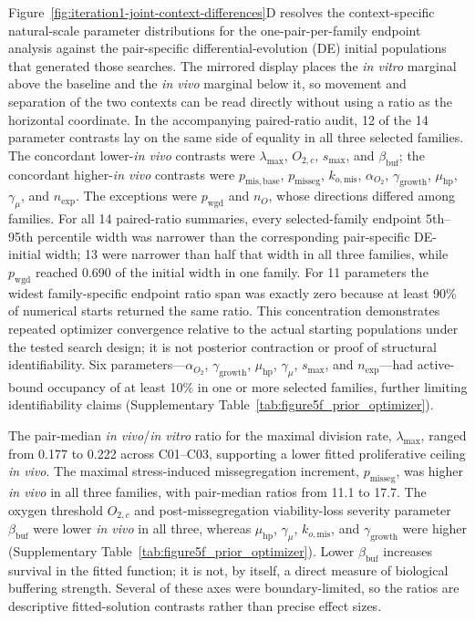 \documentclass[11pt]{article}
\begin{document}
Figure~\ref{fig:iteration1-joint-context-differences}D resolves the context-specific natural-scale parameter distributions for the one-pair-per-family endpoint analysis against the pair-specific differential-evolution (DE) initial populations that generated those searches. The mirrored display places the \textit{in vitro} marginal above the baseline and the \textit{in vivo} marginal below it, so movement and separation of the two contexts can be read directly without using a ratio as the horizontal coordinate. In the accompanying paired-ratio audit, 12 of the 14 parameter contrasts lay on the same side of equality in all three selected families. The concordant lower-\textit{in vivo} contrasts were $\lambda_{\max}$, $O_{2,c}$, $s_{\max}$, and $\beta_{\mathrm{buf}}$; the concordant higher-\textit{in vivo} contrasts were $p_{\mathrm{mis,base}}$, $p_{\mathrm{misseg}}$, $k_{o,\mathrm{mis}}$, $\alpha_{O_2}$, $\gamma_{\mathrm{growth}}$, $\mu_{\mathrm{hp}}$, $\gamma_\mu$, and $n_{\mathrm{exp}}$. The exceptions were $p_{\mathrm{wgd}}$ and $n_O$, whose directions differed among families. For all 14 paired-ratio summaries, every selected-family endpoint 5th--95th percentile width was narrower than the corresponding pair-specific DE-initial width; 13 were narrower than half that width in all three families, while $p_{\mathrm{wgd}}$ reached 0.690 of the initial width in one family. For 11 parameters the widest family-specific endpoint ratio span was exactly zero because at least 90\% of numerical starts returned the same ratio. This concentration demonstrates repeated optimizer convergence relative to the actual starting populations under the tested search design; it is not posterior contraction or proof of structural identifiability. Six parameters---$\alpha_{O_2}$, $\gamma_{\mathrm{growth}}$, $\mu_{\mathrm{hp}}$, $\gamma_\mu$, $s_{\max}$, and $n_{\mathrm{exp}}$---had active-bound occupancy of at least 10\% in one or more selected families, further limiting identifiability claims (Supplementary Table~\ref{tab:figure5f_prior_optimizer}).

The pair-median \textit{in vivo}/\textit{in vitro} ratio for the maximal division rate, \(\lambda_{\max}\), ranged from 0.177 to 0.222 across C01--C03, supporting a lower fitted proliferative ceiling \textit{in vivo}. The maximal stress-induced missegregation increment, \(p_{\mathrm{misseg}}\), was higher \textit{in vivo} in all three families, with pair-median ratios from 11.1 to 17.7. The oxygen threshold \(O_{2,c}\) and post-missegregation viability-loss severity parameter \(\beta_{\mathrm{buf}}\) were lower \textit{in vivo} in all three, whereas \(\mu_{\mathrm{hp}}\), \(\gamma_\mu\), \(k_{o,\mathrm{mis}}\), and \(\gamma_{\mathrm{growth}}\) were higher (Supplementary Table~\ref{tab:figure5f_prior_optimizer}). Lower \(\beta_{\mathrm{buf}}\) increases survival in the fitted function; it is not, by itself, a direct measure of biological buffering strength. Several of these axes were boundary-limited, so the ratios are descriptive fitted-solution contrasts rather than precise effect sizes.
\end{document}
